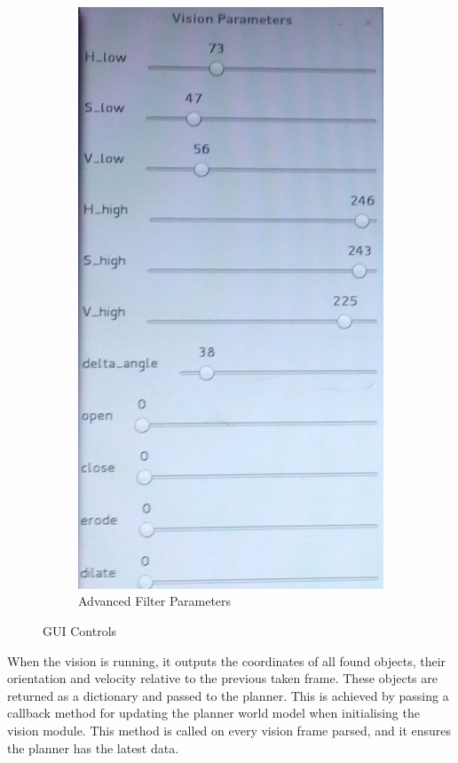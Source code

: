 \begin{figure}[H]
\begin{subfigure}{.5\textwidth}
\centering
\includegraphics[scale=0.2]{vision_params}
\caption{Advanced Filter Parameters}
\label{fig:params}
\end{subfigure}
\caption{GUI Controls}
\label{fig:sliders}
\end{figure}





When the vision is running, it outputs the coordinates of all found objects, their orientation and velocity relative to the previous taken frame. These objects are returned as a dictionary and passed to the planner. This is achieved by passing a callback method for updating the planner world model when initialising the vision module. This method is called on every vision frame parsed, and it ensures the planner has the latest data.

